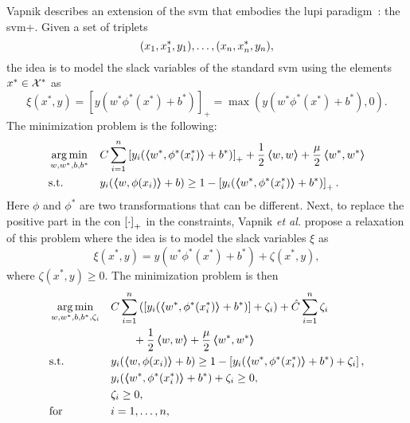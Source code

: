 Vapnik describes an extension of the \acrshort{svm} that embodies the \acrshort{lupi} paradigm~\citep{VapnikV09,VapnikI15a}: the \acrshort{svm}+. Given a set of triplets
\begin{equation}
    \nonumber
    (x_1, x^*_1, y_1), \ldots, (x_n, x^*_n, y_n) ,
\end{equation}
the idea is to model the slack variables of the standard \acrshort{svm} using the elements $x^* \in \mathcal{X}^*$ as
$$ \xi(x^*, y) = \left[y (w^* \phi^*(x^*) + b^*) \right]_+  = \max\left( y (w^* \phi^*(x^*) + b^*), 0  \right).$$
The minimization problem is the following:
\begin{equation}
    \label{eq:svmplus_original}
    \begin{aligned}
        & \argmin_{w, w^*, b, b^*}
        & &  C \sum_{i=1}^\nsamples \left[y_i (\dotp{w^*}{\phi^*(x_i^*)} + b^*) \right]_+ + \frac{1}{2} \dotp{w}{w} + \frac{\mu}{2} \dotp{w^*}{w^*} \\
        & \text{s.t.}
        & & y_{i} ( \dotp{w}{\phi(x_{i})} + b) \geq 1 - \left[y_i (\dotp{w^*}{\phi^*(x^*_i)} + b^*) \right]_+ .
    \end{aligned}
\end{equation}
Here $\phi$ and $\phi^*$ are two transformations that can be different.
Next, to replace the positive part in the con $\left[\cdot\right]_{+}$ in the constraints,
Vapnik \emph{et al.} propose a relaxation of this problem where the idea is to model the slack variables $\xi$ as
$$ \xi(x^*, y) = y (w^* \phi^*(x^*) + b^*) + \zeta(x^*, y) ,$$
where $\zeta(x^*, y) \geq 0$.
The minimization problem is then
\begin{equation}
    \label{eq:svmplus_delta_primal}
    \begin{aligned}
        & \argmin_{w, w^*, b, b^*, \zeta_i}
        & &  C \sum_{i=1}^\nsamples \left( \left[y_i (\dotp{w^*}{\phi^*(x_i^*)} + b^*) \right] + \zeta_i \right) + \hat{C} \sum_{i=1}^\nsamples \zeta_i \\
        & & &\qquad + \frac{1}{2} \dotp{w}{w} + \frac{\mu}{2} \dotp{w^*}{w^*} \\
        & \text{s.t.}
        & & y_{i} ( \dotp{w}{\phi(x_{i})} + b) \geq 1 - \left[y_i (\dotp{w^*}{\phi^*(x^*_i)} + b^*) + \zeta_i \right] ,\\
        & & &y_i (\dotp{w^*}{\phi^*(x^*_i)} + b^*) + \zeta_i \geq 0 ,\\
        & & &\zeta_i \geq 0, \\
        & \text{for } & & i=1, \ldots, \nsamples,
    \end{aligned}
\end{equation}
